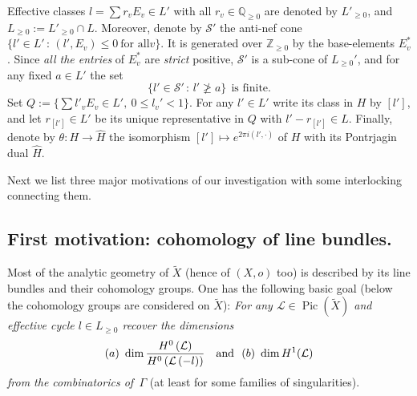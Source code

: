 \documentclass[10pt,a4paper]{amsart}
\numberwithin{equation}{section}
\numberwithin{equation}{subsection}
\theoremstyle{plain}
\theoremstyle{definition}
\begin{document}
Effective classes \(l=\sum r_vE_v\in L'\) with all
\(r_v\in{\mathbb{Q}}_{\geq 0}\) are denoted by \(L'_{\geq 0}\), and
$L_{\geq 0}:=L'_{\geq 0}\cap L$. Moreover, denote by ${\mathcal{S}}'$ the
anti-nef cone $\{l'\in L'\,:\, (l',E_v)\leq 0 \ \mbox{for all
$v$}\}$.  It is generated over ${\mathbb{Z}}_{\geq 0}$ by the
base-elements $E_v^*$. Since  {\em all the entries } of $E_v^*$
are {\em strict} positive, ${\mathcal{S}}'$ is a sub-cone of $L_{\geq 0}'$,
and for any fixed $a\in L'$ the set
\begin{equation}\label{eq:finite}
\{l'\in {\mathcal{S}}'\,:\, l'\ngeq a\} \ \ \mbox{is finite}.
\end{equation}
Set \(Q:=\{\sum l'_vE_v\in L', \ 0\leq l_v' < 1\}\).
For any $l'\in L'$ write its class in $H$ by $[l']$, and let
$r_{[l']}\in L'$  be its unique representative  in $Q$
with $l'-r_{[l']}\in L$. Finally,
denote by $\theta:H\to \widehat{H}$ the isomorphism $[l']\mapsto
e^{2\pi i(l',\cdot)}$ of $H$ with its Pontrjagin dual
$\widehat{H}$.

\vspace{2mm}

Next we list three major motivations of our investigation with some
interlocking  connecting them.

\subsection{First motivation: cohomology of line
bundles.}\label{FM}
 Most of the analytic geometry of \(\widetilde{X}\) (hence of $(X,o)$ too)
is described by its line bundles and their  cohomology groups. One
has the following basic goal (below the cohomology groups are
considered on $\widetilde{X}$):
 {\em For any \({\mathcal{L}}\in{\operatorname{Pic} ( {\widetilde{X}} )}\)
 and effective cycle $l\in L_{\geq 0}$ recover the dimensions
\begin{equation}\label{eq:00}
 (a)  \ \dim {\mathchoice
         \frac{{H^0 \left({\mathcal{L}}  \right)}}{{H^0
\left( {\mathcal{L}} \left( - l \right)
 \right)}}   
  {\mathinner{{{H^0 \left({\mathcal{L}}  \right)}}/{{H^0
\left( {\mathcal{L}} \left( - l \right)
 \right)}}}}
  {\mathinner{{{H^0 \left({\mathcal{L}}  \right)}}/{{H^0
\left( {\mathcal{L}} \left( - l \right)
 \right)}}}}
  {\mathinner{{{H^0 \left({\mathcal{L}}  \right)}}/{{H^0
\left( {\mathcal{L}} \left( - l \right)
 \right)}}}}
}\ \ \ \mbox{and} \ \    (b) \ \dim H^1({\mathcal{L}})
 \end{equation}
 from the combinatorics of \,$\Gamma$} (at least for some families of
 singularities).
\end{document}
